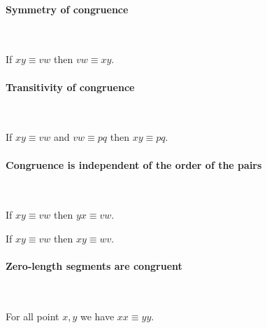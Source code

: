\documentclass[10pt,a4paper,parskip=half,numbers=endperiod,headings=standardclasses,parskip]{scrartcl}
\newcommand{\Cong}[4]{#1 #2 \equiv #3 #4}
\begin{document}
  \paragraph{Symmetry of congruence}\

  \begin{forthel}
    \begin{lemma} %
      If $\Cong{x}{y}{v}{w}$
      then $\Cong{v}{w}{x}{y}$.
    \end{lemma}
  \end{forthel}


  \paragraph{Transitivity of congruence}\

  \begin{forthel}
    \begin{lemma} %
      If $\Cong{x}{y}{v}{w}$ and $\Cong{v}{w}{p}{q}$
      then $\Cong{x}{y}{p}{q}$.
    \end{lemma}
  \end{forthel}


  \paragraph{Congruence is independent of the order of the pairs}\

  \begin{forthel}
    \begin{lemma} %
      If $\Cong{x}{y}{v}{w}$
      then $\Cong{y}{x}{v}{w}$.
    \end{lemma}

    \begin{lemma} %
      If $\Cong{x}{y}{v}{w}$
      then $\Cong{x}{y}{w}{v}$.
    \end{lemma}
  \end{forthel}


  \paragraph{Zero-length segments are congruent}\

  \begin{forthel}
    \begin{lemma} %
      For all point $x, y$ we have $\Cong{x}{x}{y}{y}$.
    \end{lemma}
  \end{forthel}
\end{document}
